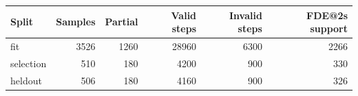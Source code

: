 \begin{tabular}{lrrrrr}
\toprule
Split & Samples & Partial & Valid steps & Invalid steps & FDE@2s support \\
\midrule
fit & 3526 & 1260 & 28960 & 6300 & 2266 \\
selection & 510 & 180 & 4200 & 900 & 330 \\
heldout & 506 & 180 & 4160 & 900 & 326 \\
\bottomrule
\end{tabular}
